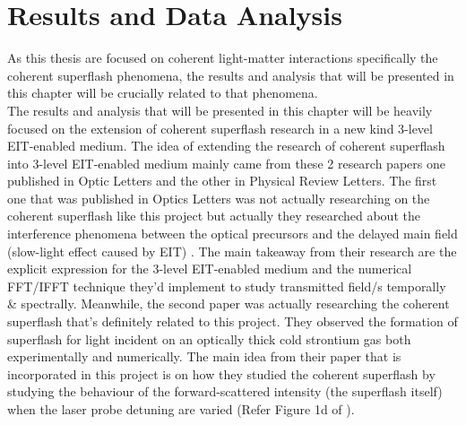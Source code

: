 \chapter{Results and Data Analysis}\label{results and analysis}
As this thesis are focused on coherent light-matter interactions specifically the coherent superflash phenomena, the results and analysis that will be presented in this chapter will be crucially related to that phenomena.\\

The results and analysis that will be presented in this chapter will be heavily focused on the extension of coherent superflash research in a new kind 3-level EIT-enabled medium. The idea of extending the research of coherent superflash into 3-level EIT-enabled medium mainly came from these 2 research papers one published in Optic Letters and the other in Physical Review Letters. The first one that was published in Optics Letters was not actually researching on the coherent superflash like this project but actually they researched about the interference phenomena between the optical precursors and the delayed main field (slow-light effect caused by EIT) \cite{Jeong2010}. The main takeaway from their research are the explicit expression for the 3-level EIT-enabled medium and the numerical FFT/IFFT technique they'd implement to study transmitted field/s temporally & spectrally. Meanwhile, the second paper \cite{Kwong2014} was actually researching the coherent superflash that's definitely related to this project. They observed the formation of superflash for light incident on an optically thick cold strontium gas both experimentally and numerically. The main idea from their paper that is incorporated in this project is on how they studied the coherent superflash by studying the behaviour of the forward-scattered intensity (the superflash itself) when the laser probe detuning are varied (Refer Figure 1d of \cite{Kwong2014}).

\newpage

